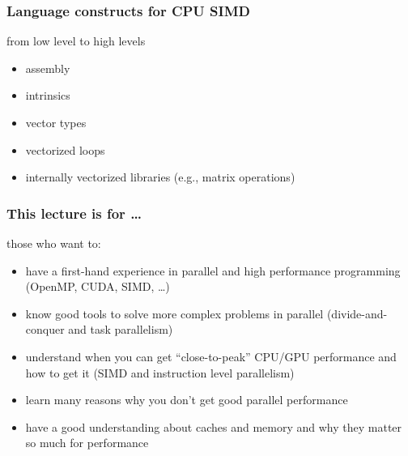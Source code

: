 \documentclass[12pt,dvipdfmx]{beamer}
\newcommand{\ao}[1]{{\color{blue}#1}}
\begin{document}
\begin{frame}
\frametitle{Language constructs for CPU SIMD}
from low level to high levels
\begin{itemize}
\item assembly
\item intrinsics
\item vector types
\item vectorized loops
\item internally vectorized libraries (e.g., matrix operations)
\end{itemize}
\end{frame}

\begin{frame}
\frametitle{This lecture is for \ldots}
those who want to:
\begin{itemize}
\item<1-> have a first-hand experience in parallel and high performance programming
  \ao{(OpenMP, CUDA, SIMD, \ldots)}
\item<2-> know good tools to solve more complex problems in parallel
  \ao{(divide-and-conquer and task parallelism)}
\item<3-> understand when you can get ``close-to-peak'' CPU/GPU performance and how to get it
  \ao{(SIMD and instruction level parallelism)}
\item<4-> learn many reasons why you don't get good parallel performance
\item<5-> have a good understanding about \ao{caches} and \ao{memory}
  and why they matter so much for performance
\end{itemize}
\end{frame}
\end{document}
